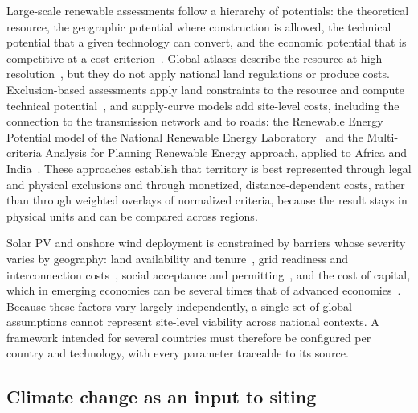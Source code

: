 Large-scale renewable assessments follow a hierarchy of potentials: the theoretical resource, the geographic potential where construction is allowed, the technical potential that a given technology can convert, and the economic potential that is competitive at a cost criterion~\cite{mckenna2022, lopez2012, brown2015}. Global atlases describe the resource at high resolution~\cite{globalsolaratlas2023, Davis2023The}, but they do not apply national land regulations or produce costs. Exclusion-based assessments apply land constraints to the resource and compute technical potential~\cite{lopez2012, ryberg2018}, %
and supply-curve models add site-level costs, including the connection to the transmission network and to roads: the Renewable Energy Potential model of the National Renewable Energy Laboratory~\cite{maclaurin2021} and the Multi-criteria Analysis for Planning Renewable Energy approach, applied to Africa and India~\cite{wu2017, deshmukh2019}. %
These approaches establish that territory is best represented through legal and physical exclusions and through monetized, distance-dependent costs, rather than through weighted overlays of normalized criteria, because the result stays in physical units and can be compared across regions.

Solar PV and onshore wind deployment is constrained by barriers whose severity varies by geography: land availability and tenure~\cite{Kiesecker2024Land, Dunnett2022Predicted}, grid readiness and interconnection costs~\cite{Gorman2024Grid, iea_integration2023}, social acceptance and permitting~\cite{Hogan2024Why, iea_arpe2024}, and the cost of capital, which in emerging economies can be several times that of advanced economies~\cite{steffen2020_cost_of_capital, Ameli2021Higher, Calcaterra2024Reducing}. Because these factors vary largely independently, a single set of global assumptions cannot represent site-level viability across national contexts. A framework intended for several countries must therefore be configured per country and technology, with every parameter traceable to its source.

\subsection{Climate change as an input to siting}

